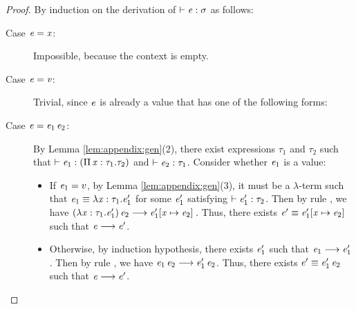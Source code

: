 \begin{proof}
    By induction on the derivation of $\vdash  \mathit{e}  :  \sigma$ as follows:
    \begin{description}
        \item[Case $\mathit{e}  =  \mathit{x}$:] Impossible, because the context is empty.
        \item[Case $\mathit{e}  =  \mathit{v}$:] Trivial, since $\mathit{e}$ is already a value that has one of the following forms:
		\begin{inparaenum}[(1)]
		    \item $\star$,
			\item $\lambda  \ottmv{x}  \ottsym{:}  \tau  \ottsym{.}  \ottnt{e}$,
			\item $\Pi \, \ottmv{x}  \ottsym{:}  \tau_{{\mathrm{1}}}  \ottsym{.}  \tau_{{\mathrm{2}}}$,
			\item $\kw{cast}^{\uparrow} \, \ottsym{[}  \tau  \ottsym{]} \,  \ottnt{e}$.
		\end{inparaenum}
		\item[Case $\mathit{e}=\mathit{e_{{\mathrm{1}}}} \, \mathit{e_{{\mathrm{2}}}}$:] By Lemma \ref{lem:appendix:gen}(2), there exist expressions $\tau_{{\mathrm{1}}}$ and $\tau_{{\mathrm{2}}}$ such that $\vdash  \mathit{e_{{\mathrm{1}}}}  :  (  \Pi \, \mathit{x}  :  \tau_{{\mathrm{1}}}  .  \tau_{{\mathrm{2}}}  )$ and $\vdash  \mathit{e_{{\mathrm{2}}}}  :  \tau_{{\mathrm{1}}}$. Consider whether $\mathit{e_{{\mathrm{1}}}}$ is a value:
    		\begin{itemize}
    		    \item If $\mathit{e_{{\mathrm{1}}}}=v$, by Lemma \ref{lem:appendix:gen}(3), it must be a $\lambda$-term such that $\mathit{e_{{\mathrm{1}}}}  \equiv  \lambda  \mathit{x}  :  \tau_{{\mathrm{1}}}  .  \mathit{e'_{{\mathrm{1}}}}$ for some $\mathit{e'_{{\mathrm{1}}}}$ satisfying $\vdash  \mathit{e'_{{\mathrm{1}}}}  :  \tau_{{\mathrm{2}}}$. Then by rule , we have $(  \lambda  \mathit{x}  :  \tau_{{\mathrm{1}}}  .  \mathit{e'_{{\mathrm{1}}}}  ) \, \mathit{e_{{\mathrm{2}}}}  \longrightarrow  \mathit{e'_{{\mathrm{1}}}}  [  \mathit{x}  \mapsto  \mathit{e_{{\mathrm{2}}}}  ] \,$. Thus, there exists $\mathit{e'}  \equiv  \mathit{e'_{{\mathrm{1}}}}  [  \mathit{x}  \mapsto  \mathit{e_{{\mathrm{2}}}}  ] \,$ such that $\mathit{e}  \longrightarrow  \mathit{e'}$.
    		    \item Otherwise, by induction hypothesis, there exists $\mathit{e'_{{\mathrm{1}}}}$ such that $\mathit{e_{{\mathrm{1}}}}  \longrightarrow  \mathit{e'_{{\mathrm{1}}}}$. Then by rule , we have $\mathit{e_{{\mathrm{1}}}} \, \mathit{e_{{\mathrm{2}}}}  \longrightarrow  \mathit{e'_{{\mathrm{1}}}} \, \mathit{e_{{\mathrm{2}}}}$. Thus, there exists $\mathit{e'}  \equiv  \mathit{e'_{{\mathrm{1}}}} \, \mathit{e_{{\mathrm{2}}}}$ such that $\mathit{e}  \longrightarrow  \mathit{e'}$.

\end{itemize}
\end{description}
\end{proof}
